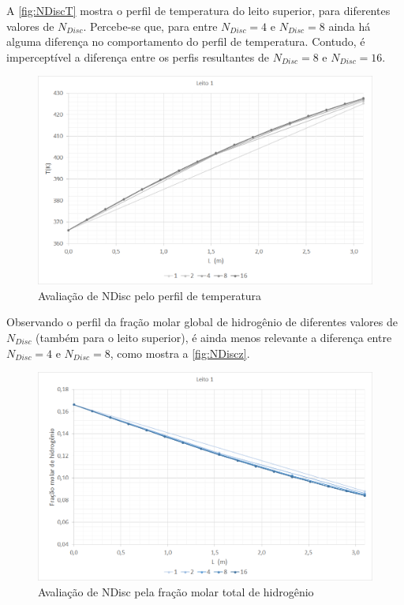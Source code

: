 A \autoref{fig:NDiscT} mostra o perfil de temperatura do leito superior, para
diferentes valores de $N_{Disc}$. Percebe-se que, para entre $N_{Disc} = 4$ e
$N_{Disc} = 8$ ainda há alguma diferença no comportamento do perfil de
temperatura. Contudo, é imperceptível a diferença entre os perfis resultantes de
$N_{Disc} = 8$ e $N_{Disc} = 16$. 

\begin{figure}[htb] \centering
\includegraphics[scale=0.4]{images/Chap4/NDiscT.png}
\caption{Avaliação de NDisc pelo perfil de temperatura}
\label{fig:NDiscT}
\end{figure}

Observando o perfil da fração molar global de hidrogênio de diferentes valores
de $N_{Disc}$ (também para o leito superior), é ainda menos relevante a
diferença entre $N_{Disc} = 4$ e $N_{Disc} = 8$, como mostra a
\autoref{fig:NDiscz}.

\begin{figure}[htb]
\centering \includegraphics[scale=0.4]{images/Chap4/NDiscz.png}
\caption{Avaliação de NDisc pela fração molar total de hidrogênio}
\label{fig:NDiscz}
\end{figure}

